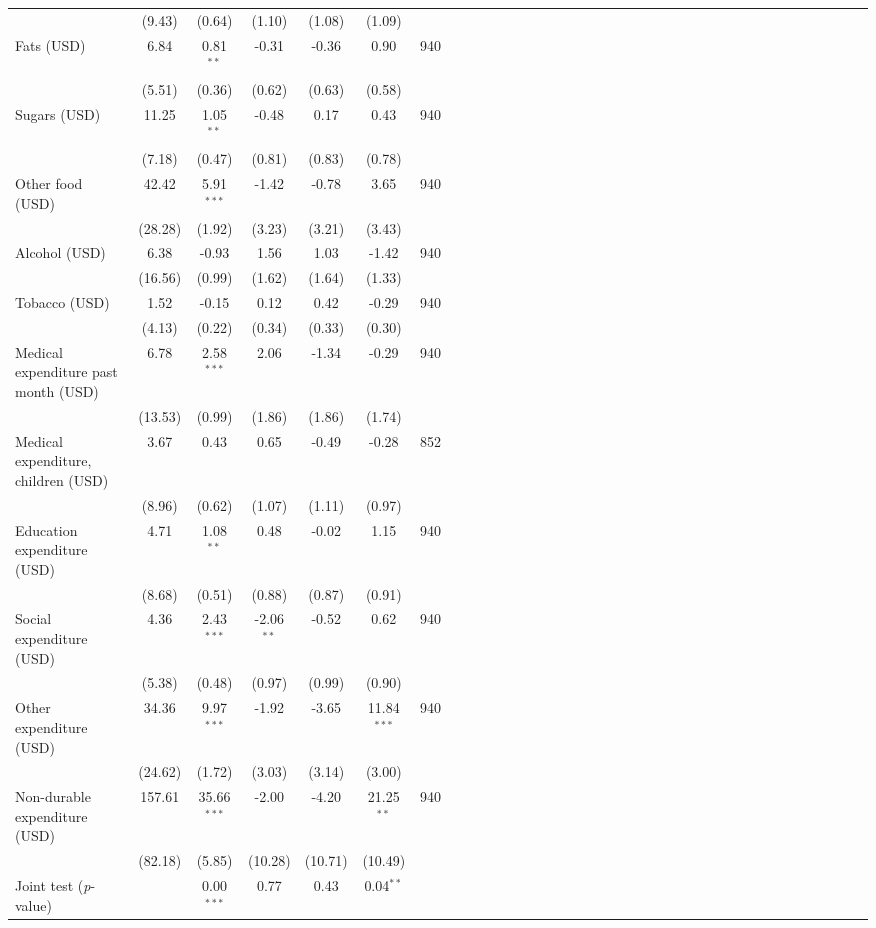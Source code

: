 {\begin{tabular}{l*{6}{SSSSSc}}
          &   (9.43)&   (0.64)&   (1.10)&   (1.08)&   (1.09)&         \\
\hspace{0.2cm}Fats (USD)&     6.84&0.81$^{**}$&    -0.31&    -0.36&     0.90&      940\\
          &   (5.51)&   (0.36)&   (0.62)&   (0.63)&   (0.58)&         \\
\hspace{0.2cm}Sugars (USD)&    11.25&1.05$^{**}$&    -0.48&     0.17&     0.43&      940\\
          &   (7.18)&   (0.47)&   (0.81)&   (0.83)&   (0.78)&         \\
\hspace{0.2cm}Other food (USD)&    42.42&5.91$^{***}$&    -1.42&    -0.78&     3.65&      940\\
          &  (28.28)&   (1.92)&   (3.23)&   (3.21)&   (3.43)&         \\
Alcohol (USD)&     6.38&    -0.93&     1.56&     1.03&    -1.42&      940\\
          &  (16.56)&   (0.99)&   (1.62)&   (1.64)&   (1.33)&         \\
Tobacco (USD)&     1.52&    -0.15&     0.12&     0.42&    -0.29&      940\\
          &   (4.13)&   (0.22)&   (0.34)&   (0.33)&   (0.30)&         \\
Medical expenditure past month (USD)&     6.78&2.58$^{***}$&     2.06&    -1.34&    -0.29&      940\\
          &  (13.53)&   (0.99)&   (1.86)&   (1.86)&   (1.74)&         \\
\hspace{0.2cm}Medical expenditure, children (USD)&     3.67&     0.43&     0.65&    -0.49&    -0.28&      852\\
          &   (8.96)&   (0.62)&   (1.07)&   (1.11)&   (0.97)&         \\
Education expenditure (USD)&     4.71&1.08$^{**}$&     0.48&    -0.02&     1.15&      940\\
          &   (8.68)&   (0.51)&   (0.88)&   (0.87)&   (0.91)&         \\
Social expenditure (USD)&     4.36&2.43$^{***}$&-2.06$^{**}$&    -0.52&     0.62&      940\\
          &   (5.38)&   (0.48)&   (0.97)&   (0.99)&   (0.90)&         \\
Other expenditure (USD)&    34.36&9.97$^{***}$&    -1.92&    -3.65&11.84$^{***}$&      940\\
          &  (24.62)&   (1.72)&   (3.03)&   (3.14)&   (3.00)&         \\
Non-durable expenditure (USD)&   157.61&35.66$^{***}$&    -2.00&    -4.20&21.25$^{**}$&      940\\
          &  (82.18)&   (5.85)&  (10.28)&  (10.71)&  (10.49)&         \\
\midrule Joint test (\emph{p}-value)&         &0.00$^{***}$&     0.77&     0.43&0.04$^{**}$&         \\
\bottomrule
\end{tabular}
}

